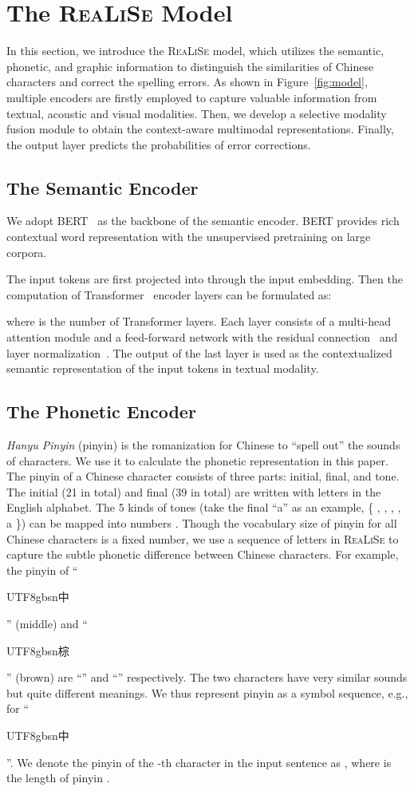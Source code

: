 \documentclass[11pt,a4paper]{article}
\newcommand\model{\textsc{ReaLiSe}}
\newcommand{\cjksong}[1]{{{\begin{CJK*}{UTF8}{gbsn}#1\end{CJK*}}}}
\begin{document}
\section{The \model{} Model}


In this section, we introduce the \model{} model, which utilizes the semantic, phonetic, and graphic information to distinguish the similarities of Chinese characters and correct the spelling errors.
As shown in Figure~\ref{fig:model}, multiple encoders are firstly employed to capture valuable information from textual, acoustic and visual modalities. Then, we develop a selective modality fusion module to obtain the context-aware multimodal representations. Finally, the output layer predicts the probabilities of error corrections.

\subsection{The Semantic Encoder}

We adopt BERT~\citep{bert} as the backbone of the semantic encoder. 
BERT provides rich contextual word representation with the unsupervised pretraining on large corpora.


The input tokens  are first projected into  through the input embedding.
Then the computation of Transformer~\citep{transformer} encoder layers can be formulated as:

where  is the number of Transformer layers. 
Each layer consists of a multi-head attention module and a feed-forward network with the residual connection~\citep{resnet} and layer normalization~\citep{layer_norm}. 
The output of the last layer  is used as the contextualized semantic representation of the input tokens in textual modality.



\subsection{The Phonetic Encoder}
\textit{Hanyu Pinyin} (pinyin) is the romanization for Chinese to ``spell out'' the sounds of characters.
We use it to calculate the phonetic representation in this paper. The pinyin of a Chinese character consists of three parts: initial, final, and tone. The initial (21 in total) and final (39 in total) are written with letters in the English alphabet. The 5 kinds of tones (take the final ``a'' as an example, \{ , , , , a \}) can be mapped into numbers .
Though the vocabulary size of pinyin for all Chinese characters is a fixed number, we use a sequence of letters in \model{} to capture the subtle phonetic difference between Chinese characters.
For example, the pinyin of ``\cjksong{中}'' (middle) and ``\cjksong{棕}'' (brown) are ``'' and ``'' respectively. The two characters have very similar sounds but quite different meanings. 
We thus represent pinyin as a symbol sequence, e.g.,  for ``\cjksong{中}''. 
We denote the pinyin of the -th character in the input sentence as , where  is the length of pinyin .
\end{document}
